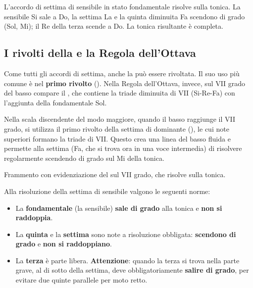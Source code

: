 \begin{esempio}
	\label{ex:vii7_maggiore}
	L'accordo di settima di sensibile in stato fondamentale risolve sulla tonica. La sensibile Si sale a Do, la settima La e la quinta diminuita Fa scendono di grado (Sol, Mi); il Re della terza scende a Do. La tonica risultante è completa.
\end{esempio}

\subsection{I rivolti della  e la Regola dell'Ottava}
\label{subsec:rivolti_vii7}

Come tutti gli accordi di settima, anche la  può essere rivoltata. Il suo uso più comune è nel \textbf{primo rivolto} (). Nella Regola dell'Ottava, invece, sul VII grado del basso compare il , che contiene la triade diminuita di VII (Si-Re-Fa) con l'aggiunta della fondamentale Sol.

\begin{regola}
	\label{reg:vii65_regola}
	Nella scala discendente del modo maggiore, quando il basso raggiunge il VII grado, si utilizza il primo rivolto della settima di dominante (), le cui note superiori formano la triade di VII. Questo crea una linea del basso fluida e permette alla settima (Fa, che si trova ora in una voce intermedia) di risolvere regolarmente scendendo di grado sul Mi della tonica.
\end{regola}

\begin{esempio}
	\label{ex:vii65_regola_maggiore}
	Frammento con evidenziazione del  sul VII grado, che risolve sulla tonica.
\end{esempio}

\begin{regola}
	\label{reg:comportamento_vii7}
	Alla risoluzione della settima di sensibile valgono le seguenti norme:
	\begin{itemize}
		\item La \textbf{fondamentale} (la sensibile) \textbf{sale di grado} alla tonica e \textbf{non si raddoppia}.
		\item La \textbf{quinta} e la \textbf{settima} sono note a risoluzione obbligata: \textbf{scendono di grado} e \textbf{non si raddoppiano}.
		\item La \textbf{terza} è parte libera. \textbf{Attenzione}: quando la terza si trova nella parte grave, al di sotto della settima, deve obbligatoriamente \textbf{salire di grado}, per evitare due quinte parallele per moto retto.
	\end{itemize}
\end{regola}

